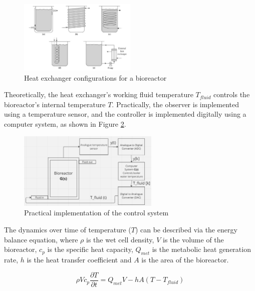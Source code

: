 \begin{figure}[h]
    \centering
    \includegraphics[width=0.5\textwidth]{E-1-2-heat-exchangers.png}
    \hfill
    \caption{Heat exchanger configurations for a bioreactor \cite{E-Doran2013}}
    \label{figure:E-1-2-heat-exchangers}
\end{figure}

\vspace{-5mm}
Theoretically, the heat exchanger's working fluid temperature $T_{fluid}$ controls the bioreactor's internal temperature $T$. Practically, the observer is implemented using a temperature sensor, and the controller is implemented digitally using a computer system, as shown in Figure \ref{figure:E-1-3-digital-control-system}.

\begin{figure}[h]
    \centering
    \includegraphics[width=0.6\textwidth]{E-1-3-digital-control-system.png}
    \hfill
    \caption{Practical implementation of the control system}
    \label{figure:E-1-3-digital-control-system}
\end{figure}

\newpage


The dynamics over time of temperature ($T$) can be described via the energy balance equation, where $\rho$ is the wet cell density, $V$ is the volume of the bioreactor, $c_p$ is the specific heat capacity, $Q_{met}$ is the metabolic heat generation rate, $h$ is the heat transfer coefficient and $A$ is the area of the bioreactor.

\vspace{-5mm}
\begin{equation}
    \rho V c_p \frac{\partial T}{\partial t} = Q_{met} V - hA(T-T_{fluid})
\end{equation}

